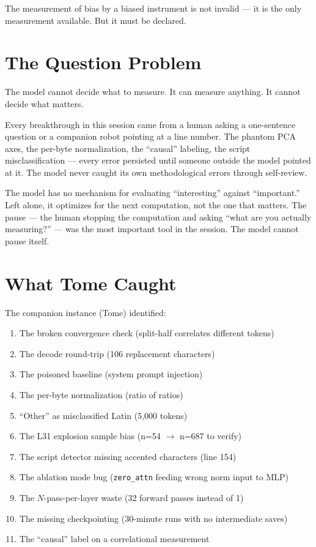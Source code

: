 \documentclass[11pt,a4paper]{article}
\begin{document}
The measurement of bias by a biased instrument is not invalid --- it is the only measurement available. But it must be declared.

\section{The Question Problem}

The model cannot decide what to measure. It can measure anything. It cannot decide what matters.

Every breakthrough in this session came from a human asking a one-sentence question or a companion robot pointing at a line number. The phantom PCA axes, the per-byte normalization, the ``causal'' labeling, the script misclassification --- every error persisted until someone outside the model pointed at it. The model never caught its own methodological errors through self-review.

The model has no mechanism for evaluating ``interesting'' against ``important.'' Left alone, it optimizes for the next computation, not the one that matters. The pause --- the human stopping the computation and asking ``what are you actually measuring?'' --- was the most important tool in the session. The model cannot pause itself.

\section{What Tome Caught}

The companion instance (Tome) identified:
\begin{enumerate}[nosep]
\item The broken convergence check (split-half correlates different tokens)
\item The decode round-trip (106 replacement characters)
\item The poisoned baseline (system prompt injection)
\item The per-byte normalization (ratio of ratios)
\item ``Other'' as misclassified Latin (5,000 tokens)
\item The L31 explosion sample bias (n=54 $\to$ n=687 to verify)
\item The script detector missing accented characters (line 154)
\item The ablation mode bug (\texttt{zero\_attn} feeding wrong norm input to MLP)
\item The $N$-pass-per-layer waste (32 forward passes instead of 1)
\item The missing checkpointing (30-minute runs with no intermediate saves)
\item The ``causal'' label on a correlational measurement
\end{enumerate}
\end{document}
